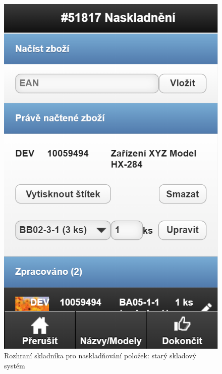 \begin{figure}[]
\includegraphics[height=0.6\textheight]{../png/sysel/naskladneni.png}
\caption{Rozhraní skladníka pro naskladňování položek: starý skladový systém} \label{picture:sysel:naskladneni}
\end{figure}

